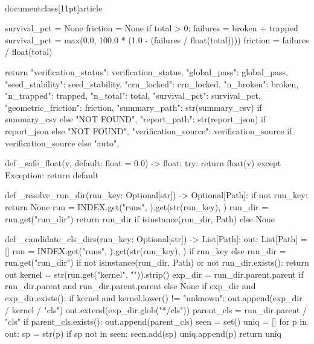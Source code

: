 \\documentclass[11pt]{article}
\begin{document}
\begin{CodeBlock}
{    survival_pct = None
    friction = None
    if total > 0:
        failures = broken + trapped
        survival_pct = max(0.0, 100.0 * (1.0 - (failures / float(total))))
        friction = failures / float(total)

    return {
        "verification_status": verification_status,
        "global_pass": global_pass,
        "seed_stability": seed_stability,
        "crn_locked": crn_locked,
        "n_broken": broken,
        "n_trapped": trapped,
        "n_total": total,
        "survival_pct": survival_pct,
        "geometric_friction": friction,
        "summary_path": str(summary_csv) if summary_csv else "NOT FOUND",
        "report_path": str(report_json) if report_json else "NOT FOUND",
        "verification_source": verification_source if verification_source else "auto",
    }


def _safe_float(v, default: float = 0.0) -> float:
    try:
        return float(v)
    except Exception:
        return default


def _resolve_run_dir(run_key: Optional[str]) -> Optional[Path]:
    if not run_key:
        return None
    run = INDEX.get("runs", {}).get(str(run_key), {})
    run_dir = run.get("run_dir")
    return run_dir if isinstance(run_dir, Path) else None


def _candidate_cls_dirs(run_key: Optional[str]) -> List[Path]:
    out: List[Path] = []
    run = INDEX.get("runs", {}).get(str(run_key), {}) if run_key else {}
    run_dir = run.get("run_dir")
    if not isinstance(run_dir, Path) or not run_dir.exists():
        return out
    kernel = str(run.get("kernel", "")).strip()
    exp_dir = run_dir.parent.parent if run_dir.parent and run_dir.parent.parent else None
    if exp_dir and exp_dir.exists():
        if kernel and kernel.lower() != "unknown":
            out.append(exp_dir / kernel / "cls")
        out.extend(exp_dir.glob("*/cls"))
    parent_cls = run_dir.parent / "cls"
    if parent_cls.exists():
        out.append(parent_cls)
    seen = set()
    uniq = []
    for p in out:
        sp = str(p)
        if sp not in seen:
            seen.add(sp)
            uniq.append(p)
    return uniq


}
\end{CodeBlock}
\end{document}
